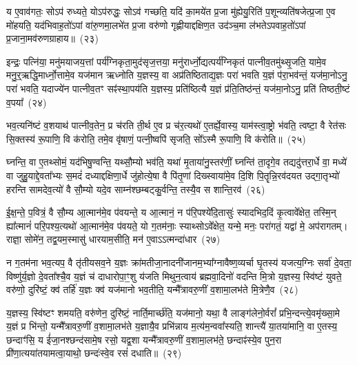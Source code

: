य ए॒वाव॑गतः॒ सो\-ऽप॑ रुध्यते॒ यो\-ऽप॑रुद्धः॒ सो\-ऽव॑ गच्छति॒ यदि॑ का॒मये॑त प्र॒जा मु॑ह्येयु॒रिति॑ प॒शून्व्यति॑षजेत्प्र॒जा ए॒व मो॑हयति॒ यद॑भिवाह॒तो॑\-ऽपां वा॑रु॒णमा॒लभे॑त प्र॒जा वरु॑णो गृह्णीयाद्दक्षिण॒त उद॑ञ्च॒मा ल॑भते\-ऽपवाह॒तो॑\-ऽ\-पां प्र॒जाना॒मव॑रुणग्राहाय॥~(२३)

{\anuvakamend[{रेतो॒ यज॑माने दधाति लो॒क ऐ॒न्द्रꣳ स॒प्तत्रिꣳ॑शच्च}]}%

इन्द्रः॒ पत्नि॑या॒ मनु॑मयाजय॒त्तां पर्य॑ग्निकृता॒मुद॑सृज॒त्तया॒ मनु॑रार्ध्नो॒द्यत्पर्य॑ग्निकृतं पात्नीव॒तमु॑थ्सृ॒जति॒ यामे॒व मनु॒र्॒\mbox{}ऋद्धि॒\-मार्ध्नो॒त्तामे॒व यज॑मान ऋध्नोति य॒ज्ञस्य॒ वा अप्र॑तिष्ठिताद्य॒ज्ञः परा॑ भवति य॒ज्ञं प॑रा॒भव॑न्तं॒ यज॑मा॒नो\-ऽनु॒ परा॑ भवति॒ यदाज्ये॑न पात्नीव॒तꣳ सꣴ॑स्था॒पय॑ति य॒ज्ञस्य॒ प्रति॑ष्ठित्यै य॒ज्ञं प्र॑ति॒तिष्ठ॑न्तं॒ यज॑मा॒नो\-ऽनु॒ प्रति॑ तिष्ठती॒ष्टं व॒पया᳚~(२४)

भव॒त्यनि॑ष्टं व॒शयाथ॑ पात्नीव॒तेन॒ प्र च॑रति ती॒र्थ ए॒व प्र च॑र॒त्यथो॑ ए॒तर्\mbox{}ह्ये॒वास्य॒ याम॑स्त्वा॒ष्ट्रो भ॑वति॒ त्वष्टा॒ वै रेत॑सः सि॒क्तस्य॑ रू॒पाणि॒ वि क॑रोति॒ तमे॒व वृ॑षाणं॒ पत्नी॒ष्वपि॑ सृजति॒ सो᳚\-ऽस्मै रू॒पाणि॒ वि क॑रोति॥~(२५)

{\anuvakamend[{व॒पया॒ षट्त्रिꣳ॑शच्च}]}%

घ्नन्ति॒ वा ए॒तथ्सोमं॒ यद॑भिषु॒ण्वन्ति॒ यथ्सौ॒म्यो भव॑ति॒ यथा॑ मृ॒ताया॑नु॒स्तर॑णीं॒ घ्नन्ति॑ ता॒दृगे॒व तद्यदु॑त्तरा॒र्धे वा॒ मध्ये॑ वा जुहु॒याद्दे॒वता᳚भ्यः स॒मदं॑ दध्याद्दक्षिणा॒र्धे जु॑होत्ये॒षा वै पि॑तृ॒णां दिख्स्वाया॑मे॒व दि॒शि पि॒तॄन्नि॒रव॑दयत उद्गा॒तृभ्यो॑ हरन्ति सामदेव॒त्यो॑ वै सौ॒म्यो यदे॒व साम्न॑श्छम्बट्कु॒र्वन्ति॒ तस्यै॒व स शान्ति॒रव॑~(२६)

ई॒क्ष॒न्ते॒ प॒वित्रं॒ वै सौ॒म्य आ॒त्मान॑मे॒व प॑वयन्ते॒ य आ॒त्मानं॒ न प॑रि॒पश्ये॑दि॒तासुः॑ स्यादभिद॒दिं कृ॒त्वावे᳚क्षेत॒ तस्मि॒न् ह्या᳚त्मानं॑ परि॒पश्य॒त्यथो॑ आ॒त्मान॑मे॒व प॑वयते॒ यो ग॒तम॑नाः॒ स्याथ्सो\-ऽवे᳚क्षेत॒ यन्मे॒ मनः॒ परा॑गतं॒ यद्वा॑ मे॒ अप॑रागतम्। राज्ञा॒ सोमे॑न॒ तद्व॒यम॒स्मासु॑ धारयाम॒सीति॒ मन॑ ए॒वा\-ऽऽ\-त्मन्दा॑धार~(२७)

न ग॒तम॑ना भव॒त्यप॒ वै तृ॑तीयसव॒ने य॒ज्ञः क्रा॑मतीजा॒नादनी॑जानम॒भ्या᳚ग्नावैष्ण॒व्यर्चा घृ॒तस्य॑ यजत्य॒ग्निः सर्वा॑ दे॒वता॒ विष्णु॑र्य॒ज्ञो दे॒वता᳚श्चै॒व य॒ज्ञं च॑ दाधारोपा॒ꣳ॒शु य॑जति मिथुन॒त्वाय॑ ब्रह्मवा॒दिनो॑ वदन्ति मि॒त्रो य॒ज्ञस्य॒ स्वि॑ष्टं युवते॒ वरु॑णो॒ दुरि॑ष्टं॒ क्व॑ तर्\mbox{}हि॑ य॒ज्ञः क्व॑ यज॑मानो भव॒तीति॒ यन्मै᳚त्रावरु॒णीं व॒शामा॒लभ॑ते मि॒त्रेणै॒व~(२८)

य॒ज्ञस्य॒ स्वि॑ष्टꣳ शमयति॒ वरु॑णेन॒ दुरि॑ष्टं॒ नार्ति॒मार्च्छ॑ति॒ यज॑मानो॒ यथा॒ वै लाङ्ग॑लेनो॒र्वरां᳚ प्रभि॒न्दन्त्ये॒वमृ॑ख्सा॒मे य॒ज्ञं प्र भि॑न्तो॒ यन्मै᳚त्रावरु॒णीं व॒शामा॒लभ॑ते य॒ज्ञायै॒व प्रभि॑न्नाय म॒त्य॑म॒न्ववा᳚स्यति॒ शान्त्यै॑ या॒तया॑मानि॒ वा ए॒तस्य॒ छन्दाꣳ॑सि॒ य ई॑जा॒नश्छन्द॑सामे॒ष रसो॒ यद्व॒शा यन्मै᳚त्रावरु॒णीं व॒शामा॒लभ॑ते॒ छन्दाꣴ॑स्ये॒व पुन॒रा प्री॑णा॒त्यया॑तयामत्वा॒याथो॒ छन्दः॑स्वे॒व रसं॑ दधाति॥~(२९)


